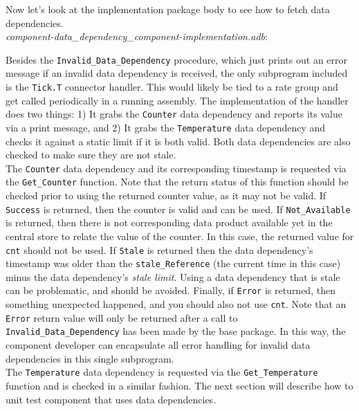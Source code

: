 Now let's look at the implementation package body to see how to fetch data dependencies. \\

\textit{component-data\_dependency\_component-implementation.adb}:

Besides the \texttt{Invalid\_Data\_Dependency} procedure, which just prints out an error message if an invalid data dependency is received, the only subprogram included is the \texttt{Tick.T} connector handler. This would likely be tied to a rate group and get called periodically in a running assembly. The implementation of the handler does two things: 1) It grabs the \texttt{Counter} data dependency and reports its value via a print message, and 2) It grabs the \texttt{Temperature} data dependency and checks it against a static limit if it is both valid. Both data dependencies are also checked to make sure they are not stale. \\

The \texttt{Counter} data dependency and its corresponding timestamp is requested via the \texttt{Get\_Counter} function. Note that the return status of this function should be checked prior to using the returned counter value, as it may not be valid. If \texttt{Success} is returned, then the counter is valid and can be used. If \texttt{Not\_Available} is returned, then there is not corresponding data product available yet in the central store to relate the value of the counter. In this case, the returned value for \texttt{cnt} should not be used. If \texttt{Stale} is returned then the data dependency's timestamp was older than the \texttt{stale\_Reference} (the current time in this case) minus the data dependency's \textit{stale limit}. Using a data dependency that is stale can be problematic, and should be avoided. Finally, if \texttt{Error} is returned, then something unexpected happened, and you should also not use \texttt{cnt}. Note that an \texttt{Error} return value will only be returned after a call to \texttt{Invalid\_Data\_Dependency} has been made by the base package. In this way, the component developer can encapsulate all error handling for invalid data dependencies in this single subprogram. \\

The \texttt{Temperature} data dependency is requested via the \texttt{Get\_Temperature} function and is checked in a similar fashion. The next section will describe how to unit test component that uses data dependencies. \\

